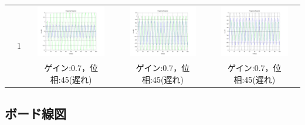 \documentclass[a4paper,11pt]{jsarticle}
\begin{document}
\begin{enumerate}
\begin{table}[H]
\begin{tabular}{|c|c|c|c|c|}
            
            &
            \multirow{2}{*}{1}
            & 
            \begin{minipage}{45mm}
              \centering
              \includegraphics[width=3cm,clip]{picture/3.png}
            \end{minipage}
            &
            \begin{minipage}{45mm}
              \centering
              \includegraphics[width=3cm,clip]{picture/6.png}
            \end{minipage}
            &
            \begin{minipage}{45mm}
              \centering
              \includegraphics[width=3cm,clip]{picture/9.png}
            \end{minipage} 
            \\\cline{3-5}

            
            &

            &
            ゲイン:0.7，位相:45(遅れ) 
            &
            ゲイン:0.7，位相:45(遅れ)
            &
            ゲイン:0.7，位相:45(遅れ) 
            \\\hline
          \end{tabular}
          \label{T:3-2-2}
      \end{table}
    \end{enumerate}
  
  \subsection{ボード線図}
\end{document}
